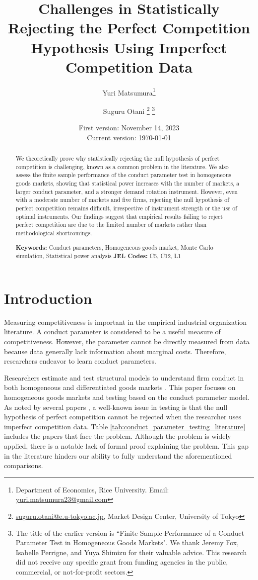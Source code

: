 \documentclass[11pt, a4paper]{article}
\title{Challenges in Statistically Rejecting the Perfect Competition Hypothesis Using Imperfect Competition Data}
\author{Yuri Matsumura\thanks{Department of Economics, Rice University. Email: \href{mailto:}{yuri.matsumura23@gmail.com}} \and Suguru Otani \thanks{\href{mailto:}{suguru.otani@e.u-tokyo.ac.jp}, Market Design Center, University of Tokyo
}
\thanks{
The title of the earlier version is ``Finite Sample Performance of a Conduct Parameter Test in Homogeneous Goods Markets".
We thank Jeremy Fox, Isabelle Perrigne, and Yuya Shimizu for their valuable advice. This research did not receive any specific grant from funding agencies in the public, commercial, or not-for-profit sectors. }}
\date{
First version: November 14, 2023\\
Current version: \today
}
\begin{document}
\maketitle
\begin{abstract}
    We theoretically prove why statistically rejecting the null hypothesis of perfect competition is challenging, known as a common problem in the literature. We also assess the finite sample performance of the conduct parameter test in homogeneous goods markets, showing that statistical power increases with the number of markets, a larger conduct parameter, and a stronger demand rotation instrument. However, even with a moderate number of markets and five firms, rejecting the null hypothesis of perfect competition remains difficult, irrespective of instrument strength or the use of optimal instruments. Our findings suggest that empirical results failing to reject perfect competition are due to the limited number of markets rather than methodological shortcomings.
\vspace{0.1in}

\noindent\textbf{Keywords:} Conduct parameters, Homogeneous goods market, Monte Carlo simulation, Statistical power analysis
\vspace{0in}
\newline
\noindent\textbf{JEL Codes:} C5, C12, L1

\bigskip
\end{abstract}


\section{Introduction}
Measuring competitiveness is important in the empirical industrial organization literature.
A conduct parameter is considered to be a useful measure of competitiveness. 
However, the parameter cannot be directly measured from data because data generally lack information about marginal costs.
Therefore, researchers endeavor to learn conduct parameters.

Researchers estimate and test structural models to understand firm conduct in both homogeneous and differentiated goods markets \citep{bresnahan1982oligopoly,nevoIdentificationOligopolySolution1998, magnolfi2022comparison, duarteTesting2024}.
This paper focuses on homogeneous goods markets and testing based on the conduct parameter model.
As noted by several papers \citep{genesove1998testing, steen1999testing, shaffer1993test}, a well-known issue in testing is that the null hypothesis of perfect competition cannot be rejected when the researcher uses imperfect competition data.
Table \ref{tab:conduct_parameter_testing_literature} includes the papers that face the problem.
Although the problem is widely applied, there is a notable lack of formal proof explaining the problem.
This gap in the literature hinders our ability to fully understand the aforementioned comparisons.
\end{document}
